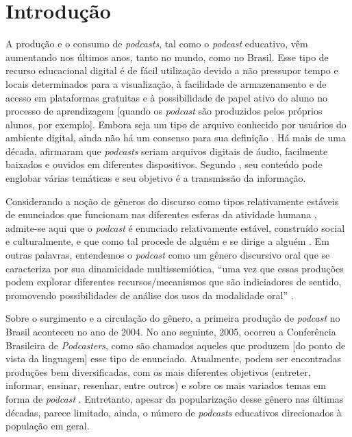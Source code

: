 \section{Introdução}\label{sec-introdução}
A produção e o consumo de \textit{podcasts}, tal como o \textit{podcast} educativo, vêm aumentando nos últimos anos, tanto no mundo, como no Brasil. Esse tipo de recurso educacional digital é de fácil utilização devido a não pressupor tempo e locais determinados para a visualização, à facilidade de armazenamento e de acesso em plataformas gratuitas e à possibilidade de papel ativo do aluno no processo de aprendizagem [quando os \textit{podcast} são produzidos pelos próprios alunos, por exemplo]. Embora seja um tipo de arquivo conhecido por usuários do ambiente digital, ainda não há um consenso para sua definição \cite{viana2020}. Há mais de uma década, \textcite{bottentuit2007} afirmaram que \textit{podcasts} seriam arquivos digitais de áudio, facilmente baixados e ouvidos em diferentes dispositivos. Segundo \textcite{ballsberry2018}, seu conteúdo pode englobar várias temáticas e seu objetivo é a transmissão da informação.

Considerando a noção de gêneros do discurso como tipos relativamente estáveis de enunciados que funcionam nas diferentes esferas da atividade humana \cite{bakhtin2016}, admite-se aqui que o \textit{podcast} é enunciado relativamente estável, construído social e culturalmente, e que como tal procede de alguém e se dirige a alguém \cite{volochinov2013}. Em outras palavras, entendemos o \textit{podcast} como um gênero discursivo oral que se caracteriza por sua dinamicidade multissemiótica, \enquote{uma vez que essas produções podem explorar diferentes recursos/mecanismos que são indiciadores de sentido, promovendo possibilidades de análise dos usos da modalidade oral} \cite[p. 53]{villarta2022}.

Sobre o surgimento e a circulação do gênero, a primeira produção de \textit{podcast} no Brasil aconteceu no ano de 2004. No ano seguinte, 2005, ocorreu a Conferência Brasileira de \textit{Podcasters}, como são chamados aqueles que produzem [do ponto de vista da linguagem] esse tipo de enunciado. Atualmente, podem ser encontradas produções bem diversificadas, com os mais diferentes objetivos (entreter, informar, ensinar, resenhar, entre outros) e sobre os mais variados temas em forma de \textit{podcast} \cite{abpod2021}. Entretanto, apesar da popularização desse gênero nas últimas décadas, parece limitado, ainda, o número de \textit{podcasts} educativos direcionados à população em geral.

